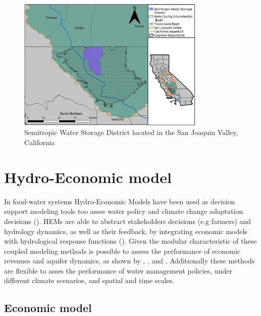 \documentclass[11pt,a4paper]{article}
\begin{document}
\begin{figure}[H]
    \centering
    \includegraphics[width=0.8\textwidth]{Map_Semitropic.jpg}
    \caption{Semitropic Water Storage District located in the San Joaquin Valley, California}
    \label{fig:1}
\end{figure}

\section{Hydro-Economic model}

In food-water systems Hydro-Economic Models have been used as decision support modeling tools too asses water policy and climate change adaptation decisions (\cite{ward_hydroeconomic_2021,harou_hydro-economic_2009}). HEMs are able to abstract stakeholders decisions (e.g farmers) and hydrology dynamics, as well as their feedback, by integrating economic models with hydrological response functions (\cite{harou_hydro-economic_2009}). Given the modular characteristic of these coupled modeling methods is possible to assess the performance of economic revenues and aquifer dynamics, as shown by \textcite{macewan_hydroeconomic_2017}, \textcite{afshar_multi-objective_2020}, \textcite{rodriguez-flores_global_2022} and \textcite{graveline_combining_2019}. Additionally these methods are flexible to asses the performance of water management policies, under different climate scenarios, and spatial and time scales.

\subsection{Economic model}
\end{document}
